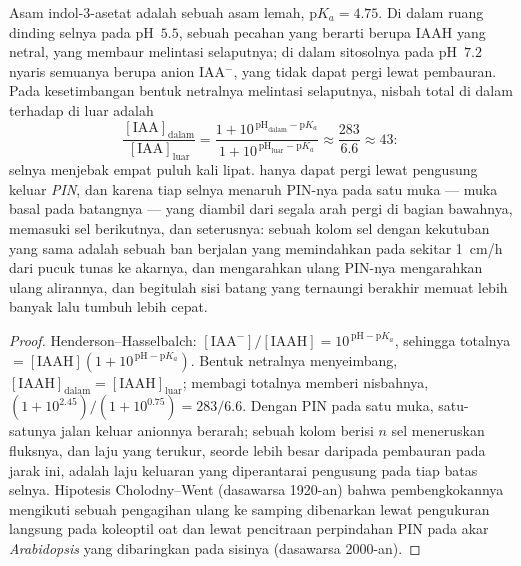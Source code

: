 \begin{theorem}\label{thm:b3:plant-molecular-physiology:auxin}
Asam indol-3-asetat adalah sebuah asam lemah, $\mathrm{p}K_{a} = 4.75$. Di dalam
ruang dinding selnya pada pH~$5.5$, sebuah pecahan yang berarti berupa IAAH yang
netral, yang membaur melintasi selaputnya; di dalam sitosolnya pada pH~$7.2$
nyaris semuanya berupa anion IAA$^{-}$, yang tidak dapat pergi lewat pembauran. Pada
kesetimbangan bentuk netralnya melintasi selaputnya, nisbah total
 di dalam terhadap di luar adalah
\[
\frac{[\text{IAA}]_{\text{dalam}}}{[\text{IAA}]_{\text{luar}}}
= \frac{1 + 10^{\,\mathrm{pH}_{\text{dalam}} - \mathrm{p}K_{a}}}{1 + 10^{\,\mathrm{pH}_{\text{luar}} - \mathrm{p}K_{a}}}
\approx \frac{283}{6.6} \approx 43 :
\]
selnya menjebak  empat puluh kali lipat.  hanya dapat pergi lewat
pengusung keluar \emph{PIN}, dan karena tiap selnya menaruh PIN-nya pada satu
muka --- muka basal pada batangnya ---  yang diambil dari segala arah
pergi di bagian bawahnya, memasuki sel berikutnya, dan seterusnya: sebuah kolom
sel dengan kekutuban yang sama adalah sebuah ban berjalan yang memindahkan  pada sekitar
\qty{1}{cm/h} dari pucuk tunas ke akarnya, dan mengarahkan ulang PIN-nya
mengarahkan ulang alirannya, dan begitulah sisi batang yang ternaungi berakhir
memuat lebih banyak  lalu tumbuh lebih cepat.
\end{theorem}
\begin{proof}
Henderson--Hasselbalch: $[\text{IAA}^{-}]/[\text{IAAH}] = 10^{\,\mathrm{pH}
- \mathrm{p}K_{a}}$, sehingga totalnya $= [\text{IAAH}](1 + 10^{\,\mathrm{pH} -
\mathrm{p}K_{a}})$. Bentuk netralnya menyeimbang, $[\text{IAAH}]_{\text{dalam}}
= [\text{IAAH}]_{\text{luar}}$; membagi totalnya memberi nisbahnya,
$(1 + 10^{2.45})/(1 + 10^{0.75}) = 283/6.6$. Dengan PIN pada satu muka,
satu-satunya jalan keluar anionnya berarah; sebuah kolom berisi $n$ sel meneruskan
fluksnya, dan laju yang terukur, seorde lebih besar daripada
pembauran pada jarak ini, adalah laju keluaran yang diperantarai pengusung pada
tiap batas selnya. Hipotesis Cholodny--Went (dasawarsa 1920-an) bahwa pembengkokannya
mengikuti sebuah pengagihan ulang  ke samping dibenarkan lewat
pengukuran langsung pada koleoptil oat dan lewat pencitraan perpindahan PIN pada
akar \emph{Arabidopsis} yang dibaringkan pada sisinya (dasawarsa 2000-an).
\end{proof}

